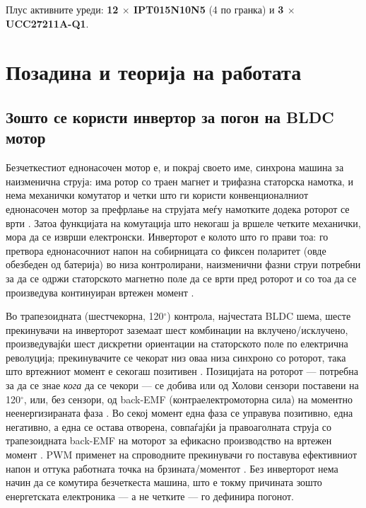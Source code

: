 \documentclass[11pt,a4paper]{article}
\newcommand{\eng}[1]{\textenglish{#1}}
\begin{document}
\noindent
Плус активните уреди: \textbf{12 $\times$ IPT015N10N5} (4 по гранка) и \textbf{3 $\times$ UCC27211A-Q1}.

\section{Позадина и теорија на работата}

\subsection{Зошто се користи инвертор за погон на BLDC мотор}

Безчеткестиот еднонасочен мотор е, и покрај своето име, синхрона машина за наизменична струја: има ротор со траен магнет и трифазна статорска намотка, и нема механички комутатор и четки што ги користи конвенционалниот еднонасочен мотор за префрлање на струјата меѓу намотките додека роторот се врти \cite{ref10,ref11}. Затоа функцијата на комутација што некогаш ја вршеле четките механички, мора да се изврши електронски. Инверторот е колото што го прави тоа: го претвора еднонасочниот напон на собирницата со фиксен поларитет (овде обезбеден од батерија) во низа контролирани, наизменични фазни струи потребни за да се одржи статорското магнетно поле да се врти пред роторот и со тоа да се произведува континуиран вртежен момент \cite{ref10,ref11}.

Во трапезоидната (шестчекорна, 120$^\circ$) контрола, најчестата BLDC шема, шесте прекинувачи на инверторот заземаат шест комбинации на вклучено/исклучено, произведувајќи шест дискретни ориентации на статорското поле по електрична револуција; прекинувачите се чекорат низ оваа низа синхроно со роторот, така што вртежниот момент е секогаш позитивен \cite{ref10}. Позицијата на роторот --- потребна за да се знае \emph{кога} да се чекори --- се добива или од Холови сензори поставени на 120$^\circ$, или, без сензори, од \eng{back-EMF} (контраелектромоторна сила) на моментно неенергизираната фаза \cite{ref10,ref11}. Во секој момент една фаза се управува позитивно, една негативно, а една се остава отворена, совпаѓајќи ја правоаголната струја со трапезоидната \eng{back-EMF} на моторот за ефикасно производство на вртежен момент \cite{ref10}. PWM применет на спроводните прекинувачи го поставува ефективниот напон и оттука работната точка на брзината/моментот \cite{ref11}. Без инверторот нема начин да се комутира безчеткеста машина, што е токму причината зошто енергетската електроника --- а не четките --- го дефинира погонот.
\end{document}
